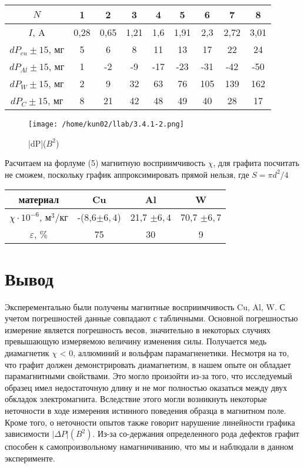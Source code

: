 \documentclass[a4paper]{article}
\begin{document}
\begin{enumerate}
\begin{center}
\begin{tabular}{|c|c|c|c|c|c|c|c|c|}
			$N$ &1&2&3&4&5&6&7&8 \\ \hline
			$I$, A & 0,28 &0,65&1,21&1,6&1,91&2,3&2,72& 3,01 \\ \hline
			$dP_{cu} \pm 15$, мг &5&6&8&11&13&17&22&24 \\ \hline
			$dP_{Al} \pm 15$, мг &1&-2&-9&-17&-23&-31&-42&-50 \\ \hline
			$dP_{W} \pm 15$, мг &2&9&32&63&76&105&139&162\\ \hline
			$dP_{C} \pm 15$, мг &8&21&42&48&49&40&28&17\\ \hline
		\end{tabular}
	\end{center}
	\begin{figure}[h!]
		\centering
		\texttt{[image: /home/kun02/llab/3.4.1-2.png]}
		\caption{|dP|($B^2$)}
		\label{pic:1}
	\end{figure}
\par Расчитаем на форлуме (5) магнитную восприимчивость $\chi$, для графита посчитать не сможем, поскольку график аппроксимировать прямой нельзя, где $S = \pi d^2/4$
\begin{center}
	\begin{tabular}{|c|c|c|c|} \hline
		материал&Cu&Al&W \\ \hline
		$\chi \cdot 10^{-6}$, $\text{$\text{м}^3$/кг} $&-(8,6$ \pm 6,4$)& 21,7 $\pm 6,4$ & 70,7 $\pm 6,7$ \\ \hline
		$\varepsilon$, $\%$ & 75 & 30 & 9 \\ \hline
		
	\end{tabular}
\end{center}
\section{Вывод}
Эксперементально были получены магнитные восприимчивость Cu, Al, W. С учетом погрешностей данные совпадают с табличными. Основной погрешностью измерение является погрешность весов, значительно в некоторых случиях превышающую измеряемою величину изменения силы. Получается медь диамагнетик $\chi $ < 0, аллюминий и вольфрам парамагненетики. Несмотря на то, что графит должен демонстрировать диамагнетизм, в нашем опыте он обладает парамагнитными свойствами. Это могло произойти из-за того, что исследуемый образец имел недостаточную длину и не мог полностью оказаться между двух обкладок электромагнита. Вследствие этого могли возникнуть некоторые неточности в ходе измерения истинного поведения образца в магнитном поле. Кроме того, о неточности опытов также говорит нарушение линейности графика зависимости $ |\Delta P|(B^2) $. Из-за со-держания определенного рода дефектов графит способен к самопроизвольному намагничиванию, что мы и наблюдали в данном эксперименте.
\end{enumerate}	
\end{document}
